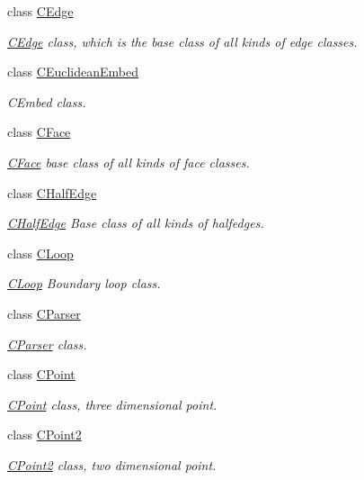 \begin{DoxyCompactItemize}
class \hyperlink{class_mesh_lib_1_1_c_edge}{C\+Edge}
\begin{DoxyCompactList}\small\item\em \hyperlink{class_mesh_lib_1_1_c_edge}{C\+Edge} class, which is the base class of all kinds of edge classes. \end{DoxyCompactList}\item 
class \hyperlink{class_mesh_lib_1_1_c_euclidean_embed}{C\+Euclidean\+Embed}
\begin{DoxyCompactList}\small\item\em C\+Embed class. \end{DoxyCompactList}\item 
class \hyperlink{class_mesh_lib_1_1_c_face}{C\+Face}
\begin{DoxyCompactList}\small\item\em \hyperlink{class_mesh_lib_1_1_c_face}{C\+Face} base class of all kinds of face classes. \end{DoxyCompactList}\item 
class \hyperlink{class_mesh_lib_1_1_c_half_edge}{C\+Half\+Edge}
\begin{DoxyCompactList}\small\item\em \hyperlink{class_mesh_lib_1_1_c_half_edge}{C\+Half\+Edge} Base class of all kinds of halfedges. \end{DoxyCompactList}\item 
class \hyperlink{class_mesh_lib_1_1_c_loop}{C\+Loop}
\begin{DoxyCompactList}\small\item\em \hyperlink{class_mesh_lib_1_1_c_loop}{C\+Loop} Boundary loop class. \end{DoxyCompactList}\item 
class \hyperlink{class_mesh_lib_1_1_c_parser}{C\+Parser}
\begin{DoxyCompactList}\small\item\em \hyperlink{class_mesh_lib_1_1_c_parser}{C\+Parser} class. \end{DoxyCompactList}\item 
class \hyperlink{class_mesh_lib_1_1_c_point}{C\+Point}
\begin{DoxyCompactList}\small\item\em \hyperlink{class_mesh_lib_1_1_c_point}{C\+Point} class, three dimensional point. \end{DoxyCompactList}\item 
class \hyperlink{class_mesh_lib_1_1_c_point2}{C\+Point2}
\begin{DoxyCompactList}\small\item\em \hyperlink{class_mesh_lib_1_1_c_point2}{C\+Point2} class, two dimensional point. \end{DoxyCompactList}\item 

\end{DoxyCompactItemize}
